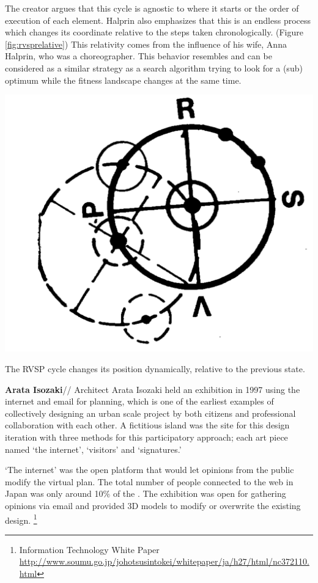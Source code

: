 The creator argues that this cycle is agnostic to where it starts or the order of execution of each element. Halprin also emphasizes that this is an endless process which changes its coordinate relative to the steps taken chronologically. (Figure \ref{fig:rvsprelative})
This relativity comes from the influence of his wife, Anna Halprin, who was a choreographer.
This behavior resembles and can be considered as a similar strategy as a search algorithm trying to look for a (sub) optimum while the fitness landscape changes at the same time.


\begin{marginfigure}
  \includegraphics[width=\textwidth]{chapters/3/fig/rvsp_relative.png}               
  \caption{The RVSP cycle changes its position dynamically, relative to the previous state.\cite{halrprin1969rsvp}}
  \label{fig:rvsprelative}
\end{marginfigure}

\textbf{Arata Isozaki}//
Architect Arata Isozaki held an exhibition in 1997 using the internet and email for planning, which is one of the earliest examples of collectively designing an urban scale project by both citizens and professional collaboration with each other. A fictitious island was the site for this design iteration with three methods for this participatory approach; each art piece named `the internet', `visitors' and `signatures.'

`The internet' was the open platform that would let opinions from the public modify the virtual plan. The total number of people connected to the web in Japan was only around 10\% of the . The exhibition was open for gathering opinions via email and provided 3D models to modify or overwrite the existing design.
\footnote{Information Technology White Paper
\url{http://www.soumu.go.jp/johotsusintokei/whitepaper/ja/h27/html/nc372110.html}}


